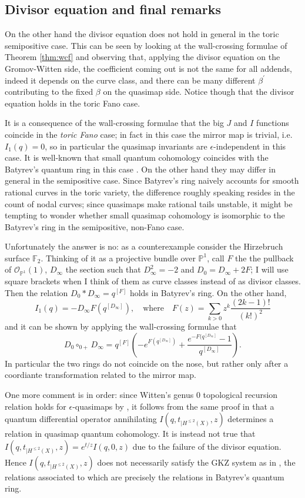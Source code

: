\documentclass[11pt]{amsart}
\newcommand{\PP}{\mathbb P}
\newcommand{\OO}{\mathcal{O}}
\theoremstyle{definition}
\theoremstyle{definition}
\newcommand{\ilemph}[1]{\emph{#1}}
\begin{document}
\subsection{Divisor equation and final remarks} On the other hand the divisor equation does not hold in general in the toric semipositive case. This can be seen by looking at the wall-crossing formulae of Theorem \ref{thm:wcf} and observing that, applying the divisor equation on the Gromov-Witten side, the coefficient coming out is not the same for all addends, indeed it depends on the curve class, and there can be many different $\beta^\prime$ contributing to the fixed $\beta$ on the quasimap side. Notice though that the divisor equation holds in the toric Fano case.

It is a consequence of the wall-crossing formulae that the big $J$ and $I$ functions coincide in the \ilemph{toric Fano} case; in fact in this case the mirror map is trivial, i.e. $I_1(q)=0$, so in particular the quasimap invariants are $\epsilon$-independent in this case. It is well-known that small quantum cohomology coincides with the Batyrev's quantum ring in this case \cite[Example 11.2.5.2]{MS}. On the other hand they may differ in general in the semipositive case. Since Batyrev's ring naively accounts for smooth rational curves in the toric variety, the difference roughly speaking resides in the count of nodal curves; since quasimaps make rational tails unstable, it might be tempting to wonder whether small quasimap cohomology is isomorphic to the Batyrev's ring in the semipositive, non-Fano case.

Unfortunately the answer is no: as a counterexample consider the Hirzebruch surface $\mathbb F_2$. Thinking of it as a projective bundle over $\PP^1$, call $F$ the the pullback of $\OO_{\PP^1}(1)$, $D_\infty$ the section such that $D_\infty^2=-2$ and $D_0=D_\infty+2F$; I will use square brackets when I think of them as curve classes instead of as divisor classes. Then the relation $D_0*D_\infty=q^{[F]}$ holds in Batyrev's ring. On the other hand, \[I_1(q)=-D_\infty F(q^{[D_\infty]}), \quad \text{where}\quad F(z)=\sum_{k>0}z^k \frac{(2k-1)!}{(k!)^2}\] and it can be shown by applying the wall-crossing formulae that
\[ D_0\circ_{0+}D_\infty=q^{[F]}\left(-e^{F(q^{[D_\infty]})}+\frac{e^{-F(q^{[D_\infty]}}-1}{q^{[D_\infty]}}\right).\]
In particular the two rings do not coincide on the nose, but rather only after a coordiante transformation related to the mirror map.

One more comment is in order: since Witten's genus $0$ topological recursion relation holds for $\epsilon$-quasimaps by \cite[Corollary 2.3.4]{CF-K-higher-genus}, it follows from the same proof in \cite[Theorem 10.3.1]{MS} that a quantum differential operator annihilating $I(q,t_{|H^{\leq 2}(X)},z)$ determines a relation in quasimap quantum cohomology. It is instead not true that $I(q,t_{|H^{\leq 2}(X)},z)=e^{t/z}I(q,0,z)$ due to the failure of the divisor equation. Hence $I(q,t_{|H^{\leq 2}(X)},z)$ does not necessarily satisfy the GKZ system as in \cite[\S 5.5.3]{MS}, the relations associated to which are precisely the relations in Batyrev's quantum ring.
\end{document}
